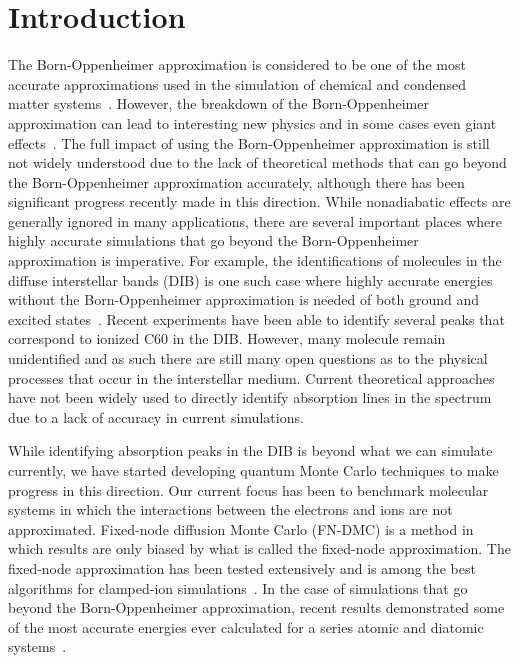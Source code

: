 \documentclass[aip,jcp,numerical,reprint]{revtex4-1}
\begin{document}
\section{Introduction}
The Born-Oppenheimer approximation is considered to be one of the most accurate approximations used in the simulation of chemical and condensed matter systems~\cite{Tubman_ECG,Martinez_Review,Cederbaum_Review}.     However, the breakdown of the Born-Oppenheimer approximation can lead to interesting new physics and in some cases even giant effects~\cite{saitta2008,giustino2016}. The full impact of using the Born-Oppenheimer approximation is still not widely understood due to the lack of theoretical methods that can go beyond the Born-Oppenheimer approximation accurately, although there has been significant progress recently made in this direction\cite{Tubman_ECG,Yang2015,Sharon_NEO-HF,Sharon_XCNEO-HF1,Sharon_XCNEO-HF2,Sharon_XCNEO-HF,Kurt_XCNEO-HF,Kurt_XCNEO-HF1,Sharon_NEO-DFT,Sharon_NEO-DFT2,Sharon_NEO-DFT3,Gross_NEO-DFT,Gross_NEO-DFT1,Ilkka_Path,Ilkka_Path1,Ilkka_Path2}.  While nonadiabatic effects are generally ignored in many applications, there are several important places where highly accurate simulations that go beyond the Born-Oppenheimer approximation is imperative.  For example, the identifications of molecules in the diffuse interstellar bands (DIB) is one such case where highly accurate energies without the Born-Oppenheimer approximation is needed of both ground and excited states~\cite{snow2006}.   Recent experiments have been able to identify several peaks that correspond to ionized C60 in the DIB\cite{campbell2015}.  However, many molecule remain unidentified and as such there are still many open questions as to the physical processes that occur in the interstellar medium.  Current theoretical approaches have not been widely used to directly identify absorption lines in the spectrum due to a lack of accuracy in current simulations.  

While identifying absorption peaks in the DIB is beyond what we can simulate currently, we have started developing quantum Monte Carlo techniques to make progress in this direction\cite{Tubman_ECG,Yang2015}.   Our current focus has been to benchmark molecular systems in which the interactions between the electrons and ions are not approximated.   Fixed-node diffusion Monte Carlo (FN-DMC) is a method in which results are only biased by what is called the fixed-node approximation.  %
The fixed-node approximation has been tested extensively and is among the best algorithms for clamped-ion simulations~\cite{grossman1,Tubman_Release,Tubman_ACS}.  In the case of simulations that go beyond the Born-Oppenheimer approximation, recent results demonstrated some of the most accurate energies ever calculated for a series atomic and diatomic systems~\cite{Yang2015}.
\end{document}
